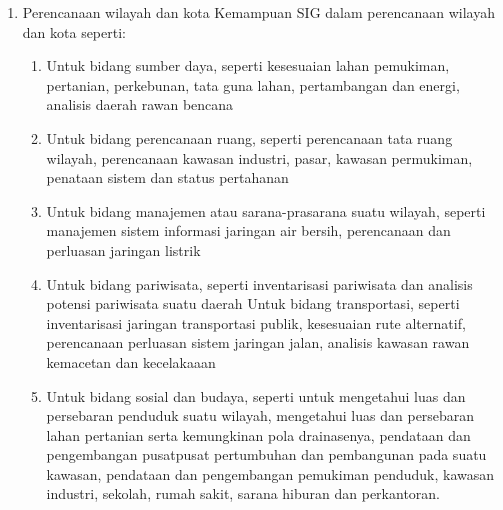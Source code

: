 \begin{enumerate}
\item Perencanaan wilayah dan kota
\subitem Kemampuan SIG dalam perencanaan wilayah dan kota seperti:
\begin{enumerate}
\item Untuk bidang sumber daya, seperti kesesuaian lahan pemukiman, pertanian, perkebunan, tata guna lahan, pertambangan dan energi, analisis daerah rawan bencana
\item Untuk bidang perencanaan ruang, seperti perencanaan tata ruang wilayah, perencanaan kawasan industri, pasar, kawasan permukiman, penataan sistem dan status pertahanan
\item Untuk bidang manajemen atau sarana-prasarana suatu wilayah, seperti manajemen sistem informasi jaringan air bersih, perencanaan dan perluasan jaringan listrik
\item Untuk bidang pariwisata, seperti inventarisasi pariwisata dan analisis potensi pariwisata suatu daerah  Untuk bidang transportasi, seperti inventarisasi jaringan transportasi publik, kesesuaian rute alternatif, perencanaan perluasan sistem jaringan jalan, analisis kawasan rawan kemacetan dan kecelakaaan
\item Untuk bidang sosial dan budaya, seperti untuk mengetahui luas dan persebaran penduduk suatu wilayah, mengetahui luas dan persebaran lahan pertanian serta kemungkinan pola drainasenya, pendataan dan pengembangan pusatpusat pertumbuhan dan pembangunan pada suatu kawasan, pendataan dan pengembangan pemukiman penduduk, kawasan industri, sekolah, rumah sakit, sarana hiburan dan perkantoran.
\end{enumerate}
\end{enumerate}


